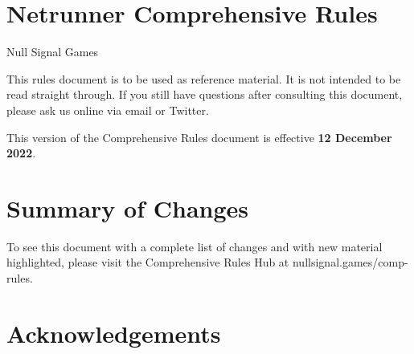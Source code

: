 \documentclass{article}
\newcommand{\subtitle}[1]{{\Large #1 \vspace{2ex}}}
\begin{document}

\section*{Netrunner Comprehensive Rules}
\subtitle{\color{darkgray}Null Signal Games}

\noindent
This rules document is to be used as reference material. It is not intended to be read straight through. If you still have questions after consulting this document, please ask us online via email or Twitter.

\noindent
This version of the Comprehensive Rules document is effective \textbf{12 December 2022}.

\section*{Summary of Changes}

\noindent
To see this document with a complete list of changes and with new material highlighted, please visit the Comprehensive Rules Hub at \textlangle{}nullsignal.games/comp-rules\textrangle.

\begin{outline}[enumerate]
\end{outline}


\newpage


\begin{multicols}{2}
  \tableofcontents
\end{multicols}


\newpage




\newpage

\section*{Acknowledgements}
\end{document}
